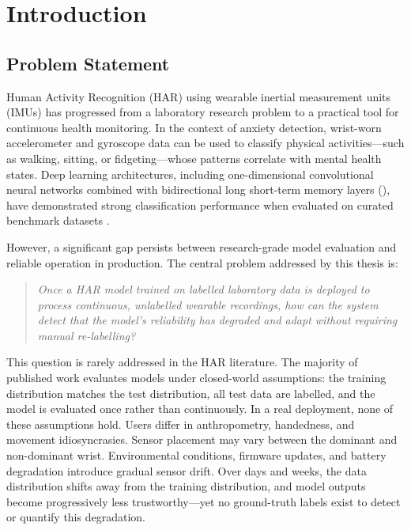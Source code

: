 \chapter{Introduction}
\label{ch:introduction}

\section{Problem Statement}
\label{sec:problem}

Human Activity Recognition (HAR) using wearable inertial measurement units
(IMUs) has progressed from a laboratory research problem to a practical tool
for continuous health monitoring.
In the context of anxiety detection, wrist-worn accelerometer and gyroscope
data can be used to classify physical activities---such as walking, sitting,
or fidgeting---whose patterns correlate with mental health states.
Deep learning architectures, including one-dimensional convolutional neural
networks combined with bidirectional long short-term memory layers
(\cnnbilstm{}), have demonstrated strong classification performance when
evaluated on curated benchmark datasets \citep{chen2021deep}.

However, a significant gap persists between research-grade model evaluation
and reliable operation in production.
The central problem addressed by this thesis is:

\begin{quote}
\textit{Once a HAR model trained on labelled laboratory data is deployed to
process continuous, unlabelled wearable recordings, how can the system detect
that the model's reliability has degraded and adapt without requiring
manual re-labelling?}
\end{quote}

This question is rarely addressed in the HAR literature.
The majority of published work evaluates models under closed-world assumptions:
the training distribution matches the test distribution, all test data are
labelled, and the model is evaluated once rather than continuously.
In a real deployment, none of these assumptions hold.
Users differ in anthropometry, handedness, and movement idiosyncrasies.
Sensor placement may vary between the dominant and non-dominant wrist.
Environmental conditions, firmware updates, and battery degradation introduce
gradual sensor drift.
Over days and weeks, the data distribution shifts away from the training
distribution, and model outputs become progressively less trustworthy---yet no
ground-truth labels exist to detect or quantify this degradation.

